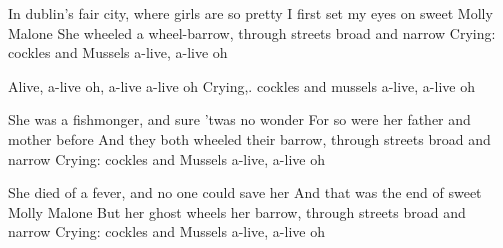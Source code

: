 \beginverse
In dublin's fair city, where girls are so pretty
I first set my eyes on sweet Molly Malone
She wheeled a wheel-barrow, through streets broad and narrow
Crying: cockles and Mussels a-live, a-live oh
\endverse

\beginchorus
Alive, a-live oh, a-live a-live oh
Crying,. cockles and mussels a-live, a-live oh
\endchorus

\beginverse
She was a fishmonger, and sure 'twas no wonder
For so were her father and mother before
And they both wheeled their barrow,
through streets broad and narrow
Crying: cockles and Mussels a-live, a-live oh
\endverse

\beginverse
She died of a fever, and no one could save her
And that was the end of sweet Molly Malone
But her ghost wheels her barrow,
through streets broad and narrow
Crying: cockles and Mussels a-live, a-live oh
\endverse
\endsong
